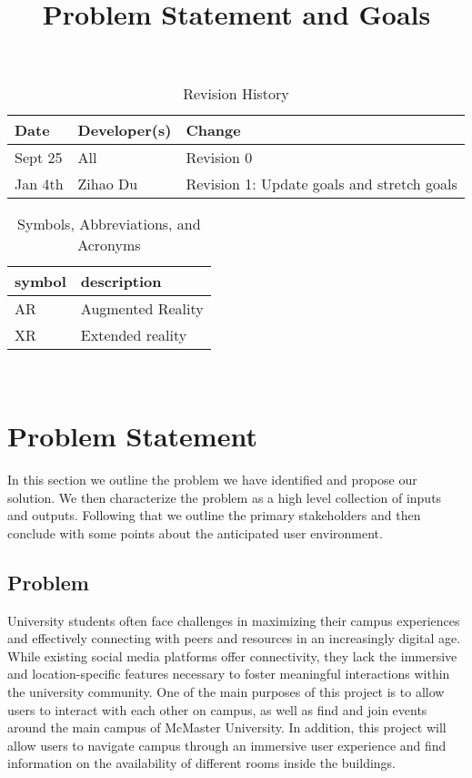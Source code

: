 \documentclass{article}
\title{Problem Statement and Goals\\\progname}
\author{\authname}
\date{}
\begin{document}
\maketitle

\begin{table}[hp]
\caption{Revision History} \label{TblRevisionHistory}
\begin{tabularx}{\textwidth}{llX}
\toprule
\textbf{Date} & \textbf{Developer(s)} & \textbf{Change}\\
\midrule
Sept 25 & All & Revision 0\\
Jan 4th & Zihao Du & Revision 1: Update goals and stretch goals\\
\bottomrule
\end{tabularx}
\end{table}

\begin{table}[H]
\center
\caption{Symbols, Abbreviations, and Acronyms} \label{Acronyms}
\begin{tabular}{l l} 
  \toprule		
  \textbf{symbol} & \textbf{description}\\
  \midrule 
  AR & Augmented Reality\\
  \midrule
  XR & Extended reality\\
  \bottomrule
\end{tabular}\\
\end{table}
\newpage

\section{Problem Statement}

In this section we outline the problem we have identified and propose our solution. We then characterize the problem as a high level collection of inputs and outputs. Following that we outline the primary stakeholders and then conclude with some points about the anticipated user environment.

\subsection{Problem}

\quad University students often face challenges in maximizing their campus experiences and effectively connecting with peers and resources in an increasingly digital age. While existing social media platforms offer connectivity, they lack the immersive and location-specific features necessary to foster meaningful interactions within the university community. One of the main purposes of this project is to allow users to interact with each other on campus, as well as find and join events around the main campus of McMaster University. In addition, this project will allow users to navigate campus through an immersive user experience and find information on the availability of different rooms inside the buildings.
\end{document}
